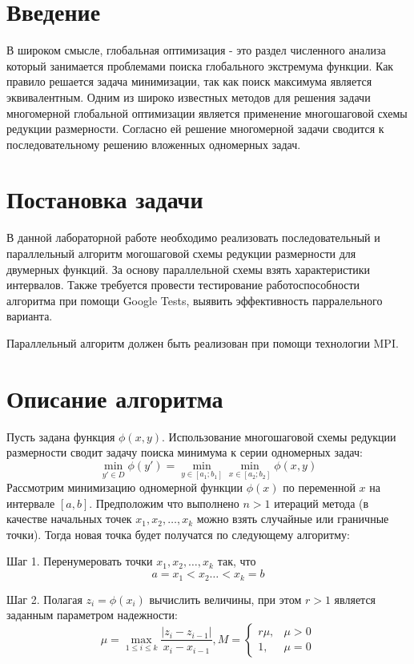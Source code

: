 \documentclass{report}
\begin{document}
\setcounter{page}{2}

\tableofcontents
\newpage

\section*{Введение}
\par В широком смысле, глобальная оптимизация  - это раздел численного анализа который занимается проблемами поиска глобального экстремума функции. Как правило решается задача минимизации, так как поиск максимума является эквивалентным.
Одним из широко известных методов для решения задачи многомерной глобальной оптимизации является применение многошаговой схемы редукции размерности. Согласно ей решение многомерной задачи сводится к последовательному решению вложенных одномерных задач.
\newpage

\section*{Постановка задачи}
\par В данной лабораторной работе необходимо реализовать последовательный и параллельный алгоритм могошаговой схемы редукции размерности для двумерных функций. За основу параллельной схемы взять характеристики интервалов. Также требуется провести тестирование работоспособности алгоритма при помощи Google Tests, выявить эффективность парралельного варианта.
\par Параллельный алгоритм должен быть реализован при помощи технологии MPI.
\newpage

\section*{Описание алгоритма}
Пусть задана функция $\phi(x, y)$. Использование многошаговой схемы редукции размерности сводит задачу поиска минимума к серии одномерных задач:
$$\min\limits_{y' \in D}\phi(y') = \min\limits_{y \in [a_1; b_1]} \min\limits_{x \in [a_2; b_2]}\phi(x, y)$$
Рассмотрим минимизацию одномерной функции $\phi(x)$ по переменной $x$ на интервале $[a, b]$. Предположим что выполнено $n>1$ итераций метода (в качестве начальных точек $x_1, x_2, \ldots, x_k$ можно взять случайные или граничные точки). Тогда новая точка будет получатся по следующему алгоритму:
\par Шаг 1. Перенумеровать точки $x_1, x_2, \ldots, x_k$ так, что
$$ a = x_1 < x_2 \ldots < x_k = b$$
\par Шаг 2. Полагая $z_i = \phi(x_i)$ вычислить величины, при этом $r>1$ является заданным параметром надежности:
$$\mu = \max\limits_{1 \leq i \leq k} \frac{|z_i - z_{i-1}|}{x_i - x_{i-1}}, M = \begin{cases} r\mu, & \mu > 0 \\ 1, & \mu=0 \end{cases} $$
\end{document}
